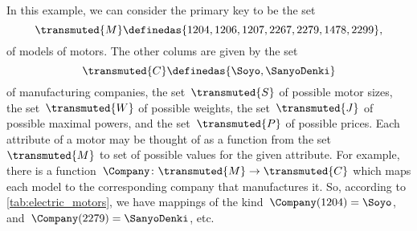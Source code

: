 \begin{comment}
  \begin{table*}[h]
    \centering
    \begin{tabular}{c|c|c|c|c|c}
      Motor ID          & Company              & Size      & \unit[Weight]{[g]} & \unit[Max Power]{[W]} & \unit[price]{[USD]} \\
      \hline
      $\textsf{Model1}$ & Company $\textsf{B}$ & 2 x 3 x 4 & 10                 &                       & 259                 \\
      $\textsf{Model2}$ & Company $\textsf{A}$ & 2 x 3 x 4 & 20                 &                       & 109                 \\
      $\textsf{Model3}$ & Company $\textsf{B}$ & 2 x 3 x 4 & 5                  &                       & 124                 \\
      $\textsf{Model4}$ & Company $\textsf{C}$ & 2 x 3 x 4 & 30                 &                       & 399                 \\
      $\textsf{Model5}$ & Company $\textsf{A}$ & 2 x 3 x 4 & 45                 &                       & 245                 \\
      $\textsf{Model6}$ & Company $\textsf{D}$ & 2 x 3 x 4 & 20                 &                       & 89                  \\
      $\textsf{Model7}$ & Company $\textsf{B}$ & 2 x 3 x 4 & 15                 &                       & 130
    \end{tabular}
    \caption{A simplified catalogue of motors.}
    \label{tab:electric_motors}
  \end{table*}
\end{comment}

In this example, we can consider the primary key to be the set
\begin{equation*}
  \transmuted{M} \definedas \{ 1204, 1206, 1207, 2267, 2279, 1478, 2299 \},
\end{equation*}
of models of motors. The other colums are given by the set
\begin{equation*}
  \transmuted{C} \definedas \{ \Soyo,\SanyoDenki\}
\end{equation*}
of manufacturing companies, the set~$\transmuted{S}$ of possible motor sizes, the set~$\transmuted{W}$ of possible weights, the set~$\transmuted{J}$ of possible maximal powers, and the set~$\transmuted{P}$ of possible prices. Each attribute of a motor may be thought of as a function from the set~$\transmuted{M}$ to set of possible values for the given attribute. For example, there is a function~$\Company\colon \transmuted{M} \to \transmuted{C}$ which maps each model to the corresponding company that manufactures it. So, according to \cref{tab:electric_motors}, we have mappings of the kind~$\Company(1204) = \Soyo$, and~$\Company(2279) =\SanyoDenki$, etc.

